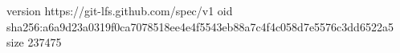 version https://git-lfs.github.com/spec/v1
oid sha256:a6a9d23a0319f0ca7078518ee4e4f5543eb88a7c4f4c058d7e5576c3dd6522a5
size 237475
